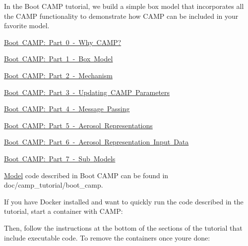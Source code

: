 In the Boot CAMP tutorial, we build a simple box model that incorporates all the CAMP functionality to demonstrate how CAMP can be included in your favorite model.


\begin{DoxyItemize}
\item \mbox{\hyperlink{camp_tutorial_part_0}{Boot CAMP\+: Part 0 -\/ Why CAMP?}}
\item \mbox{\hyperlink{camp_tutorial_part_1}{Boot CAMP\+: Part 1 -\/ Box Model}}
\item \mbox{\hyperlink{camp_tutorial_part_2}{Boot CAMP\+: Part 2 -\/ Mechanism}}
\item \mbox{\hyperlink{camp_tutorial_part_3}{Boot CAMP\+: Part 3 -\/ Updating CAMP Parameters}}
\item \mbox{\hyperlink{camp_tutorial_part_4}{Boot CAMP\+: Part 4 -\/ Message Passing}}
\item \mbox{\hyperlink{camp_tutorial_part_5}{Boot CAMP\+: Part 5 -\/ Aerosol Representations}}
\item \mbox{\hyperlink{camp_tutorial_part_6}{Boot CAMP\+: Part 6 -\/ Aerosol Representation Input Data}}
\item \mbox{\hyperlink{camp_tutorial_part_7}{Boot CAMP\+: Part 7 -\/ Sub Models}}
\end{DoxyItemize}

\mbox{\hyperlink{struct_model}{Model}} code described in Boot CAMP can be found in {\ttfamily doc/camp\+\_\+tutorial/boot\+\_\+camp}.

If you have Docker installed and want to quickly run the code described in the tutorial, start a container with CAMP\+: 
\begin{DoxyCode}{0}

\end{DoxyCode}
 Then, follow the instructions at the bottom of the sections of the tutorial that include executable code. To remove the containers once you\textquotesingle{}re done\+: 
\begin{DoxyCode}{0}

\end{DoxyCode}
 